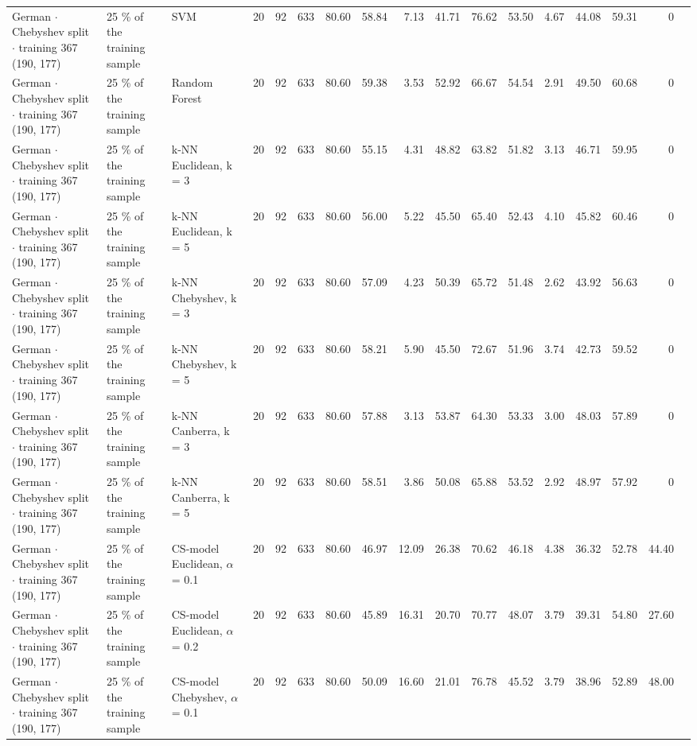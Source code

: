 \begin{longtable}{lllrrrrrrrrrrrrrl}
  German $\cdot$ Chebyshev split $\cdot$ training 367 (190, 177) & 25 \% of the training sample & SVM & 20 & 92 & 633 & 80.60 & 58.84 & 7.13 & 41.71 & 76.62 & 53.50 & 4.67 & 44.08 & 59.31 & 0 &  \\
  German $\cdot$ Chebyshev split $\cdot$ training 367 (190, 177) & 25 \% of the training sample & Random Forest & 20 & 92 & 633 & 80.60 & 59.38 & 3.53 & 52.92 & 66.67 & 54.54 & 2.91 & 49.50 & 60.68 & 0 &  \\
  German $\cdot$ Chebyshev split $\cdot$ training 367 (190, 177) & 25 \% of the training sample & k-NN Euclidean, k = 3 & 20 & 92 & 633 & 80.60 & 55.15 & 4.31 & 48.82 & 63.82 & 51.82 & 3.13 & 46.71 & 59.95 & 0 &  \\
  German $\cdot$ Chebyshev split $\cdot$ training 367 (190, 177) & 25 \% of the training sample & k-NN Euclidean, k = 5 & 20 & 92 & 633 & 80.60 & 56.00 & 5.22 & 45.50 & 65.40 & 52.43 & 4.10 & 45.82 & 60.46 & 0 &  \\
  German $\cdot$ Chebyshev split $\cdot$ training 367 (190, 177) & 25 \% of the training sample & k-NN Chebyshev, k = 3 & 20 & 92 & 633 & 80.60 & 57.09 & 4.23 & 50.39 & 65.72 & 51.48 & 2.62 & 43.92 & 56.63 & 0 &  \\
  German $\cdot$ Chebyshev split $\cdot$ training 367 (190, 177) & 25 \% of the training sample & k-NN Chebyshev, k = 5 & 20 & 92 & 633 & 80.60 & 58.21 & 5.90 & 45.50 & 72.67 & 51.96 & 3.74 & 42.73 & 59.52 & 0 &  \\
  German $\cdot$ Chebyshev split $\cdot$ training 367 (190, 177) & 25 \% of the training sample & k-NN Canberra, k = 3 & 20 & 92 & 633 & 80.60 & 57.88 & 3.13 & 53.87 & 64.30 & 53.33 & 3.00 & 48.03 & 57.89 & 0 &  \\
  German $\cdot$ Chebyshev split $\cdot$ training 367 (190, 177) & 25 \% of the training sample & k-NN Canberra, k = 5 & 20 & 92 & 633 & 80.60 & 58.51 & 3.86 & 50.08 & 65.88 & 53.52 & 2.92 & 48.97 & 57.92 & 0 &  \\
  German $\cdot$ Chebyshev split $\cdot$ training 367 (190, 177) & 25 \% of the training sample & CS-model Euclidean, $\alpha$ = 0.1 & 20 & 92 & 633 & 80.60 & 46.97 & 12.09 & 26.38 & 70.62 & 46.18 & 4.38 & 36.32 & 52.78 & 44.40 &  \\
  German $\cdot$ Chebyshev split $\cdot$ training 367 (190, 177) & 25 \% of the training sample & CS-model Euclidean, $\alpha$ = 0.2 & 20 & 92 & 633 & 80.60 & 45.89 & 16.31 & 20.70 & 70.77 & 48.07 & 3.79 & 39.31 & 54.80 & 27.60 &  \\
  German $\cdot$ Chebyshev split $\cdot$ training 367 (190, 177) & 25 \% of the training sample & CS-model Chebyshev, $\alpha$ = 0.1 & 20 & 92 & 633 & 80.60 & 50.09 & 16.60 & 21.01 & 76.78 & 45.52 & 3.79 & 38.96 & 52.89 & 48.00 &  \\

\end{longtable}
